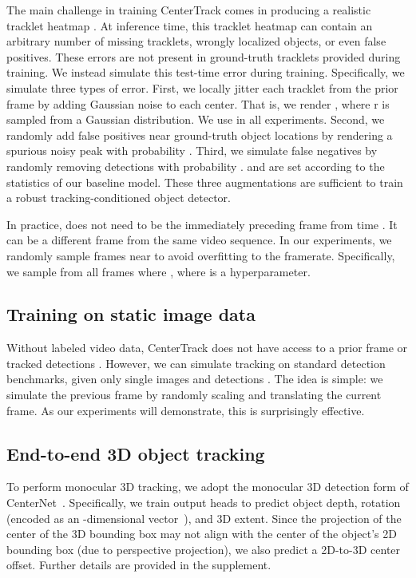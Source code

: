 \documentclass[runningheads]{llncs}
\newcommand{\lblsec}[1]{\label{sec:#1}}
\begin{document}
The main challenge in training CenterTrack comes in producing a realistic tracklet heatmap .
At inference time, this tracklet heatmap can contain an arbitrary number of missing tracklets, wrongly localized objects, or even false positives.
These errors are not present in ground-truth tracklets  provided during training.
We instead simulate this test-time error during training.
Specifically, we simulate three types of error.
First, we locally jitter each tracklet  from the prior frame by adding Gaussian noise to each center. That is, we render , where r is sampled from a Gaussian distribution. We use  in all experiments. 
Second, we randomly add false positives near ground-truth object locations by rendering a spurious noisy peak  with probability .
Third, we simulate false negatives by randomly removing detections with probability .
 and  are set according to the statistics of our baseline model.
These three augmentations are sufficient to train a robust tracking-conditioned object detector.

In practice,  does not need to be the immediately preceding frame from time . 
It can be a different frame from the same video sequence.
In our experiments, we randomly sample frames near  to avoid overfitting to the framerate. Specifically, we sample from all frames  where , where  is a hyperparameter.

\vspace{-4mm}

\subsection{Training on static image data}
\lblsec{train_image}
\label{sec:trainimage}
Without labeled video data, CenterTrack does not have access to a prior frame  or tracked detections .
However, we can simulate tracking on standard detection benchmarks, given only single images  and detections .
The idea is simple: we simulate the previous frame by randomly scaling and translating the current frame. As our experiments will demonstrate, this is surprisingly effective.

\vspace{-4mm}

\subsection{End-to-end 3D object tracking}
To perform monocular 3D tracking, we adopt the monocular 3D detection form of CenterNet~\cite{zhou2019objects}.
Specifically, we train output heads to predict object depth, rotation (encoded as an -dimensional vector~\cite{Hu3DT19}), and 3D extent. 
Since the projection of the center of the 3D bounding box may not align with the center of the object's 2D bounding box (due to perspective projection), we also predict a 2D-to-3D center offset.
Further details are provided in the supplement.
\end{document}
